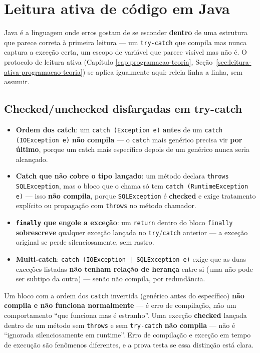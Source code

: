 \section{Leitura ativa de código em Java}
\label{sec:leitura-ativa-java-teoria}

Java é a linguagem onde erros gostam de se esconder \textbf{dentro} de
uma estrutura que parece correta à primeira leitura --- um
\texttt{try-catch} que compila mas nunca captura a exceção certa, um
escopo de variável que parece visível mas não é. O protocolo de leitura
ativa (Capítulo \ref{cap:programacao-teoria},
Seção~\ref{sec:leitura-ativa-programacao-teoria}) se aplica igualmente
aqui: releia linha a linha, sem assumir.

\subsection{Checked/unchecked disfarçadas em try-catch}

\begin{conceito}
\begin{itemize}
\item \textbf{Ordem dos catch}: um \texttt{catch (Exception e)}
\textbf{antes} de um \texttt{catch (IOException e)} \textbf{não compila}
--- o \texttt{catch} mais genérico precisa vir \textbf{por último},
porque um catch mais específico depois de um genérico nunca seria
alcançado.
\item \textbf{Catch que não cobre o tipo lançado}: um método declara
\texttt{throws SQLException}, mas o bloco que o chama só tem
\texttt{catch (RuntimeException e)} --- isso \textbf{não compila}, porque
\texttt{SQLException} é \textbf{checked} e exige tratamento explícito ou
propagação com \texttt{throws} no método chamador.
\item \textbf{\texttt{finally} que engole a exceção}: um \texttt{return}
dentro do bloco \texttt{finally} \textbf{sobrescreve} qualquer exceção
lançada no \texttt{try}/\texttt{catch} anterior --- a exceção original se
perde silenciosamente, sem rastro.
\item \textbf{Multi-catch}: \texttt{catch (IOException | SQLException e)}
exige que as duas exceções listadas \textbf{não tenham relação de
herança} entre si (uma não pode ser subtipo da outra) --- senão não
compila, por redundância.
\end{itemize}
\end{conceito}

\begin{cuidado}
Um bloco com a ordem dos \texttt{catch} invertida (genérico antes do
específico) \textbf{não compila e não funciona normalmente} --- é erro
de compilação, não um comportamento “que funciona mas é estranho”. Uma
exceção \textbf{checked} lançada dentro de um método sem
\texttt{throws} e sem \texttt{try-catch} \textbf{não compila} --- não é
“ignorada silenciosamente em runtime”. Erro de compilação e exceção em
tempo de execução são fenômenos diferentes, e a prova testa se essa
distinção está clara.
\end{cuidado}

